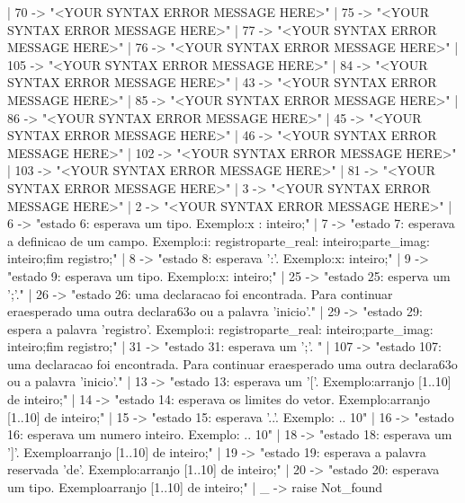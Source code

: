 \documentclass[12pt,a4paper,twoside]{article}
\begin{document}
\begin{terminal}
    | 70 ->
        "<YOUR SYNTAX ERROR MESSAGE HERE>\n"
    | 75 ->
        "<YOUR SYNTAX ERROR MESSAGE HERE>\n"
    | 77 ->
        "<YOUR SYNTAX ERROR MESSAGE HERE>\n"
    | 76 ->
        "<YOUR SYNTAX ERROR MESSAGE HERE>\n"
    | 105 ->
        "<YOUR SYNTAX ERROR MESSAGE HERE>\n"
    | 84 ->
        "<YOUR SYNTAX ERROR MESSAGE HERE>\n"
    | 43 ->
        "<YOUR SYNTAX ERROR MESSAGE HERE>\n"
    | 85 ->
        "<YOUR SYNTAX ERROR MESSAGE HERE>\n"
    | 86 ->
        "<YOUR SYNTAX ERROR MESSAGE HERE>\n"
    | 45 ->
        "<YOUR SYNTAX ERROR MESSAGE HERE>\n"
    | 46 ->
        "<YOUR SYNTAX ERROR MESSAGE HERE>\n"
    | 102 ->
        "<YOUR SYNTAX ERROR MESSAGE HERE>\n"
    | 103 ->
        "<YOUR SYNTAX ERROR MESSAGE HERE>\n"
    | 81 ->
        "<YOUR SYNTAX ERROR MESSAGE HERE>\n"
    | 3 ->
        "<YOUR SYNTAX ERROR MESSAGE HERE>\n"
    | 2 ->
        "<YOUR SYNTAX ERROR MESSAGE HERE>\n"
    | 6 ->
        "estado 6: esperava um tipo. Exemplo:\n   x : inteiro;\n"
    | 7 ->
        "estado 7: esperava a definicao de um campo. Exemplo:\n   i: registro\n         parte_real: inteiro;\n         parte_imag: inteiro;\n      fim registro;\n      "
    | 8 ->
        "estado 8: esperava ':'. Exemplo:\n   x: inteiro;\n   "
    | 9 ->
        "estado 9: esperava um tipo. Exemplo:\n   x: inteiro;\n"
    | 25 ->
        "estado 25: esperva um ';'.\n"
    | 26 ->
        "estado 26: uma declaracao foi encontrada. Para continuar era\n   esperado uma outra declara\163o ou a palavra 'inicio'.\n"
    | 29 ->
        "estado 29: espera a palavra 'registro'. Exemplo:\n   i: registro\n         parte_real: inteiro;\n         parte_imag: inteiro;\n      fim registro;\n"
    | 31 ->
        "estado 31: esperava um ';'. \n"
    | 107 ->
        "estado 107: uma declaracao foi encontrada. Para continuar era\n   esperado uma outra declara\163o ou a palavra 'inicio'.\n"
    | 13 ->
        "estado 13: esperava um '['. Exemplo:\n   arranjo [1..10] de inteiro;\n"
    | 14 ->
        "estado 14: esperava os limites do vetor. Exemplo:\n   arranjo [1..10] de inteiro;\n"
    | 15 ->
        "estado 15: esperava '..'. Exemplo: .. 10\n"
    | 16 ->
        "estado 16: esperava um numero inteiro. Exemplo: .. 10\n"
    | 18 ->
        "estado 18: esperava um ']'. Exemplo\n   arranjo [1..10] de inteiro;\n"
    | 19 ->
        "estado 19: esperava a palavra reservada 'de'. Exemplo:\n   arranjo [1..10] de inteiro;\n"
    | 20 ->
        "estado 20: esperava um tipo. Exemplo\n   arranjo [1..10] de inteiro;\n"
    | _ ->
        raise Not_found


\end{terminal}
\end{document}
